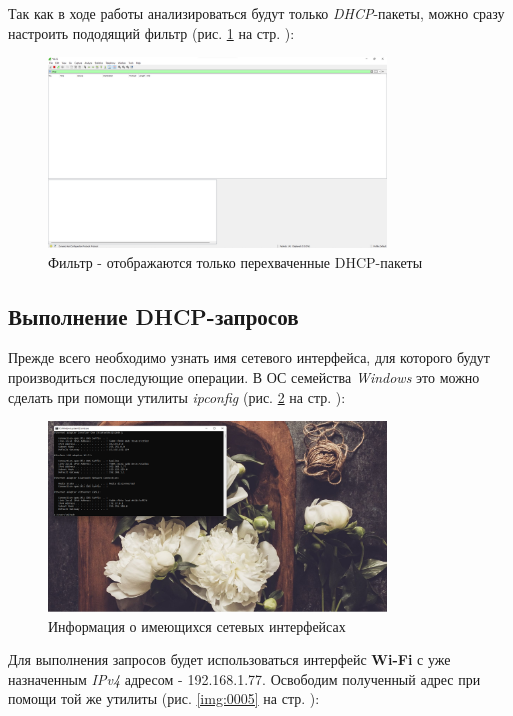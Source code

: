 \documentclass[a4paper]{article}
\begin{document}
  Так как в ходе работы анализироваться будут только \textit{DHCP}-пакеты,
  можно сразу настроить пододящий фильтр (рис. \ref{img:0003} на стр. \pageref{img:0003}):

  \begin{figure}[H]
    \centering
    \includegraphics[width=0.8\textwidth]{04_00 (3)}
    \caption{Фильтр - отображаются только перехваченные DHCP-пакеты}
    \label{img:0003}
  \end{figure}

  \subsection{Выполнение DHCP-запросов}

  Прежде всего необходимо узнать имя сетевого интерфейса, для которого
  будут производиться последующие операции. В ОС семейства \textit{Windows}
  это можно сделать при помощи утилиты \textit{ipconfig} (рис. \ref{img:0004} на стр. \pageref{img:0004}):
  
  \begin{figure}[H]
    \centering
    \includegraphics[width=0.8\textwidth]{04_00 (4)}
    \caption{Информация о имеющихся сетевых интерфейсах}
    \label{img:0004}
  \end{figure}

  Для выполнения запросов будет использоваться интерфейс \textbf{Wi-Fi} с
  уже назначенным \textit{IPv4} адресом - 192.168.1.77.
 Освободим полученный адрес при помощи той же утилиты (рис. \ref{img:0005} на стр. \pageref{img:0005}):
\end{document}
